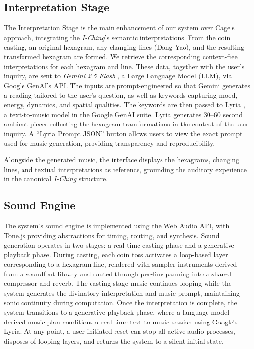 \documentclass{article}
\begin{document}
\subsection{Interpretation Stage}\label{subsec:interpretation}
The Interpretation Stage is the main enhancement of our system over Cage's approach, integrating the \textit{I-Ching}'s semantic interpretations. 
From the coin casting, an original hexagram, any changing lines (Dong Yao), and the resulting transformed hexagram are formed.
We retrieve the corresponding context-free interpretations for each hexagram and line.
These data, together with the user's inquiry, are sent to \textit{Gemini 2.5 Flash} \cite{team2023gemini, comanici2025gemini}, a Large Language Model (LLM), via Google GenAI's API.
The inputs are prompt-engineered so that Gemini generates a reading tailored to the user's question, as well as keywords capturing mood, energy, dynamics, and spatial qualities.
The keywords are then passed to Lyria \cite{team2025live}, a text-to-music model in the Google GenAI suite.
Lyria generates 30–60 second ambient pieces reflecting the hexagram transformations in the context of the user inquiry.
A “Lyria Prompt JSON” button allows users to view the exact prompt used for music generation, providing transparency and reproducibility.

Alongside the generated music, the interface displays the hexagrams, changing lines, and textual interpretations as reference, grounding the auditory experience in the canonical \textit{I-Ching} structure.

\subsection{Sound Engine}
The system’s sound engine is implemented using the Web Audio API, with Tone.js providing abstractions for timing, routing, and synthesis. Sound generation operates in two stages: a real-time casting phase and a generative playback phase. During casting, each coin toss activates a loop-based layer corresponding to a hexagram line, rendered with sampler instruments derived from a soundfont library and routed through per-line panning into a shared compressor and reverb. The casting-stage music continues looping while the system generates the divinatory interpretation and music prompt, maintaining sonic continuity during computation. Once the interpretation is complete, the system transitions to a generative playback phase, where a language-model–derived music plan conditions a real-time text-to-music session using Google’s Lyria. At any point, a user-initiated reset can stop all active audio processes, disposes of looping layers, and returns the system to a silent initial state.
\end{document}
